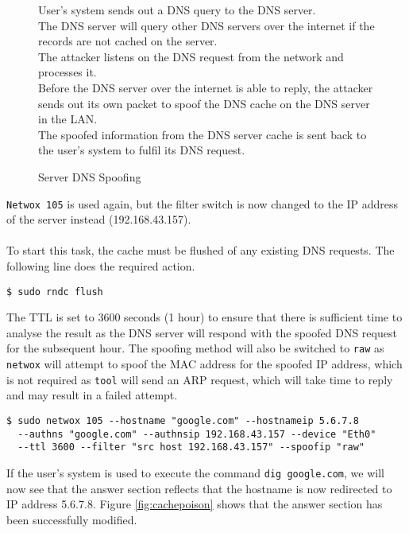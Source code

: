 \documentclass[a4paper,12pt]{article}
\newcommand*\circled[1]{\tikz[baseline=(char.base)]{
		\node[shape=circle,draw,inner sep=2pt] (char) {#1};}}
\begin{document}
\begin{par}
\begin{figure}[H]
					\begin{flushleft}
					\circled{1} User's system sends out a DNS query to the DNS server.\\
					\circled{2} The DNS server will query other DNS servers over the internet if the records are not cached on the server.\\
					\circled{3} The attacker listens on the DNS request from the network and processes it.\\
					\circled{4} Before the DNS server over the internet is able to reply, the attacker sends out its own packet to spoof the DNS cache on the DNS server in the LAN.\\
					\circled{5} The spoofed information from the DNS server cache is sent back to the user's system to fulfil its DNS request.
					\end{flushleft}
					\centering
					
					\caption{Server DNS Spoofing}
					\label{fig:SpoofServRes}
				\end{figure}
\noindent \texttt{Netwox 105} is used again, but the filter switch is now changed to the IP address of the server instead (192.168.43.157).
\\\\To start this task, the cache must be flushed of any existing DNS requests. The following line does the required action.
\end{par}
\begin{verbatim}
$ sudo rndc flush
\end{verbatim}
\begin{par}
\noindent
The TTL is set to 3600 seconds (1 hour) to ensure that there is sufficient time to analyse the result as the DNS server will respond with the spoofed DNS request for the subsequent hour. The spoofing method will also be switched to \texttt{raw} as \texttt{netwox} will attempt to spoof the MAC address for the spoofed IP address, which is not required as \texttt{tool} will send an ARP request, which will take time to reply and may result in a failed attempt.
\end{par}
\begin{verbatim}
$ sudo netwox 105 --hostname "google.com" --hostnameip 5.6.7.8 
  --authns "google.com" --authnsip 192.168.43.157 --device "Eth0" 
  --ttl 3600 --filter "src host 192.168.43.157" --spoofip "raw"
\end{verbatim}
If the user's system is used to execute the command \texttt{dig google.com}, we will now see that the answer section reflects that the hostname is now redirected to IP address 5.6.7.8. Figure \ref{fig:cachepoison} shows that the answer section has been successfully modified.
\end{document}
